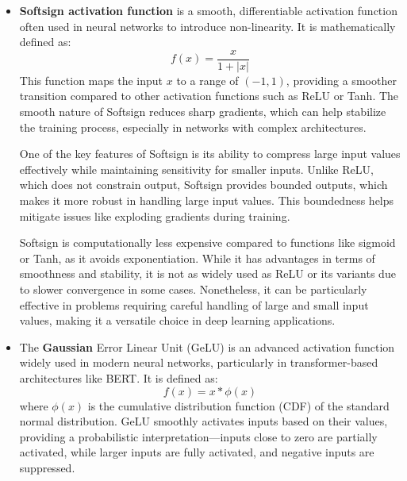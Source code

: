 \documentclass[english,12pt, titlepage]{article}
\begin{document}
\begin{itemize}
		
		\item  \textbf{Softsign activation function} is a smooth, differentiable activation function often used in neural networks to introduce non-linearity. It is mathematically defined as:
		\begin{equation*}
			f(x) = \frac{x}{1 + |x|}
		\end{equation*}
		This function maps the input $x$ to a range of $(-1, 1)$, providing a smoother transition compared to other activation functions such as ReLU or Tanh. The smooth nature of Softsign reduces sharp gradients, which can help stabilize the training process, especially in networks with complex architectures.
		
		One of the key features of Softsign is its ability to compress large input values effectively while maintaining sensitivity for smaller inputs. Unlike ReLU, which does not constrain output, Softsign provides bounded outputs, which makes it more robust in handling large input values. This boundedness helps mitigate issues like exploding gradients during training.
		
		Softsign is computationally less expensive compared to functions like sigmoid or Tanh, as it avoids exponentiation. While it has advantages in terms of smoothness and stability, it is not as widely used as ReLU or its variants due to slower convergence in some cases. Nonetheless, it can be particularly effective in problems requiring careful handling of large and small input values, making it a versatile choice in deep learning applications.
		\item The \textbf{Gaussian} Error Linear Unit (GeLU) is an advanced activation function widely used in modern neural networks, particularly in transformer-based architectures like BERT. It is defined as:
		\begin{equation*}
			f(x) = x * \phi (x)
		\end{equation*}
		where $\phi(x)$ is the cumulative distribution function (CDF) of the standard normal distribution. GeLU smoothly activates inputs based on their values, providing a probabilistic interpretation—inputs close to zero are partially activated, while larger inputs are fully activated, and negative inputs are suppressed.
		

\end{itemize}
\end{document}
